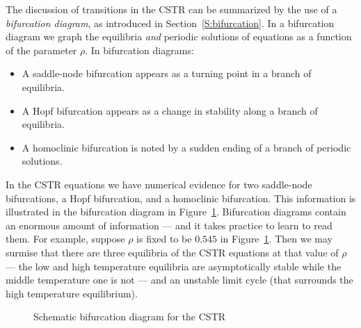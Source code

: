 \documentclass{ximera}
\begin{document}
The discussion of transitions in the 
CSTR can be summarized by the use of a 
{\em bifurcation diagram\/}, as introduced in Section~\ref{S:bifurcation}.  
In a bifurcation diagram we graph the equilibria {\em and\/} periodic 
solutions of equations as a function of the parameter $\rho$.  In 
bifurcation diagrams: 
\begin{itemize}
\item	A saddle-node bifurcation appears as a turning point in 
	a branch of equilibria.
\item	A Hopf bifurcation appears as a change in stability along 
	a branch of equilibria.
\item	A homoclinic bifurcation is noted by a sudden ending of a 
	branch of periodic solutions.
\end{itemize}
In the CSTR equations we have numerical evidence for two saddle-node 
bifurcations, a Hopf bifurcation, and a homoclinic bifurcation.  
This information is illustrated in the bifurcation diagram in 
Figure~\ref{F:CSTRbif}.  Bifurcation diagrams contain an enormous amount 
of information --- and it takes practice to learn to read them.  For 
example, suppose $\rho$ is fixed to be $0.545$ in Figure~\ref{F:CSTRbif}.
Then we may surmise that there are three equilibria of the CSTR equations
at that value of $\rho$ --- the low and high temperature equilibria are 
asymptotically stable while the middle temperature one is not --- and an 
unstable limit cycle (that surrounds the high temperature equilibrium).

\begin{figure}[htb]
           \centerline{%
	   }
           \caption{Schematic bifurcation diagram for the CSTR}
           \label{F:CSTRbif}
\end{figure}


\EXER

\CEXER
\end{document}
